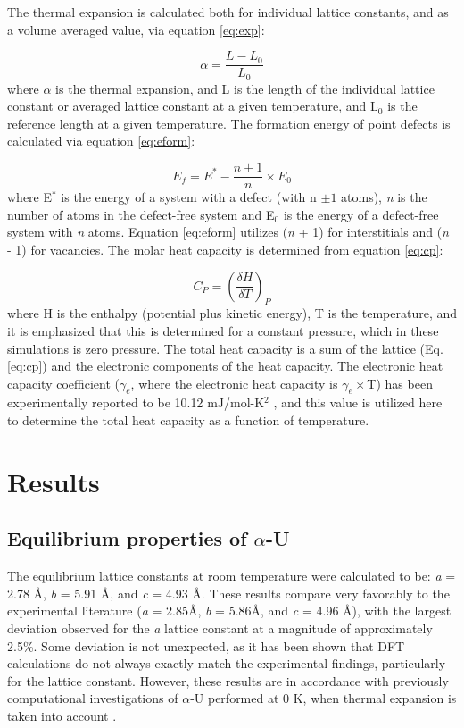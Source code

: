 \documentclass[utf8]{frontiersSCNS} %
\begin{document}
The thermal expansion is calculated both for individual lattice constants, and as a volume averaged value, via equation \ref{eq:exp}:

\begin{equation}
\label{eq:exp}
\alpha = \frac{L-L_0}{L_0} 
\end{equation}where $\alpha$ is the thermal expansion, and L is the length of the individual lattice constant or averaged lattice constant at a given temperature, and L$_0$ is the reference length at a given temperature. The formation energy of point defects is calculated via equation \ref{eq:eform}: 

\begin{equation}
\label{eq:eform}
E_f = E^* - \frac{n \pm 1}{n} \times E_0
\end{equation}where E$^{*}$ is the energy of a system with a defect (with n $\pm 1$ atoms), \textit{n} is the number of atoms in the defect-free system and E$_{0}$ is the energy of a defect-free system with \textit{n} atoms. Equation \ref{eq:eform} utilizes (\textit{n} + 1) for interstitials and (\textit{n} - 1) for vacancies. The molar heat capacity is determined from equation \ref{eq:cp}:

\begin{equation}
\label{eq:cp}
C_{P} = \left(\frac{\delta H}{\delta T}\right)_{P}
\end{equation}where H is the enthalpy (potential plus kinetic energy), T is the temperature, and it is emphasized that this is determined for a constant pressure, which in these simulations is zero pressure. The total heat capacity is a sum of the lattice (Eq. \ref{eq:cp}) and the electronic components of the heat capacity. The electronic heat capacity coefficient ($\gamma_e$, where the electronic heat capacity is $\gamma_e\times$T) has been experimentally reported to be 10.12 mJ/mol-K$^2$ \cite{marchidan1976, schachinger1989} , and this value is utilized here to determine the total heat capacity as a function of temperature. 

\section{Results}

\subsection{Equilibrium properties of $\alpha$-U}

The equilibrium lattice constants at room temperature were calculated to be: \textit{a} = 2.78 \AA, \textit{b} = 5.91 \AA, and \textit{c} = 4.93 \AA. These results compare very favorably to the experimental literature (\textit{a} = 2.85\AA, \textit{b} = 5.86\AA, and \textit{c} = 4.96 \AA \cite{lawson1988}), with the largest deviation observed for the \textit{a} lattice constant at a magnitude of approximately 2.5\%. Some deviation is not unexpected, as it has been shown that DFT calculations do not always exactly match the experimental findings, particularly for the lattice constant. However, these results are in accordance with previously computational investigations of $\alpha$-U performed at 0 K, when thermal expansion is taken into account \cite{wirth2011,beeler2013}. 
\end{document}
